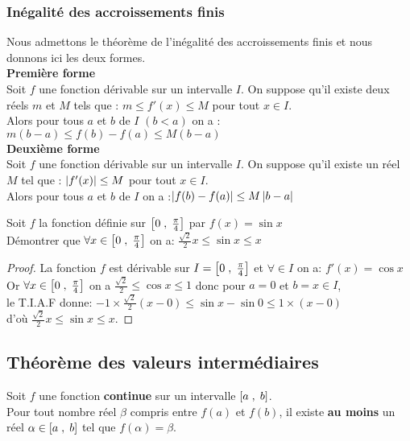   \subsubsection*{Inégalité des accroissements finis}
  Nous admettons le théorème de l'inégalité des accroissements finis et nous donnons ici les deux formes.\\
\textbf{\color{magenta}Première forme} \\
 Soit $ f $ une fonction dérivable sur un intervalle $ I $. On suppose qu'il existe deux réels $m $ et $ M$ tels que :\colorbox{green!20!}{ $ m\leq f'(x) \leq M $} \quad pour tout $ x\in I $. \\ Alors pour tous $a $ et $ b$ de $ I $  $(b < a)  $ on a :\colorbox{green!20!} {$ m(b-a)\leq f(b)-f(a) \leq M(b-a) $}  \\
 
 \textbf{\color{magenta}Deuxième forme} \\
 Soit $ f $ une fonction dérivable sur un intervalle $ I $. On suppose qu'il existe un réel $ M$ tel que :\colorbox{green!20!}{ $ \left\lvert  f'(x) \right\rvert \leq M $} \quad pour tout $ x\in I $. \\ Alors pour tous $a $ et $ b$ de $ I $   on a :\colorbox{green!20!} {$ \left\lvert  f(b)-f(a) \right\rvert\leq M \left\lvert b-a \right\rvert$}
 
\begin{exercice}
 Soit $ f $ la fonction définie sur $ \left[0\;,\; \frac{\pi}{4}\right] $ par $ f(x)= \sin x $\\
 Démontrer que $ \forall x \in \left[0\;,\; \frac{\pi}{4}\right] $ on a: $ \frac{\sqrt{2}}{2}x \leq \sin x \leq x $\\
\end{exercice}
\begin{proof}
 La fonction $ f $ est dérivable sur $ I=\left[0\;,\; \frac{\pi}{4}\right] $  et $ \forall \in I $ on a: $ f'(x)=\cos x $ \\ Or $ \forall x \in \left[0\;,\; \frac{\pi}{4}\right] $ on a $ \frac{\sqrt{2}}{2} \leq \cos x \leq 1 $ donc pour $ a=0 $ et $ b=x\in I $,\\ le T.I.A.F donne: $-1\times \frac{\sqrt{2}}{2}(x-0) \leq \sin x -\sin 0 \leq 1\times (x-0) $\\ d'où   $ \frac{\sqrt{2}}{2}x \leq \sin x \leq x $.
 \end{proof}
 \subsection{ Théorème des valeurs intermédiaires}
 \begin{theorem}[T.V.I]
 Soit $ f $ une fonction \textbf{\color{magenta}continue} sur un intervalle $ \left[a\;,\; b\right] $. \\
 Pour tout nombre réel $ \beta $ compris entre $f(a) $ et $f(b) $, il existe \textbf{\color{magenta} au moins} un réel $ \alpha \in \left[a\;,\; b\right] $ tel que $ f(\alpha)= \beta. $
 \end{theorem}
 
